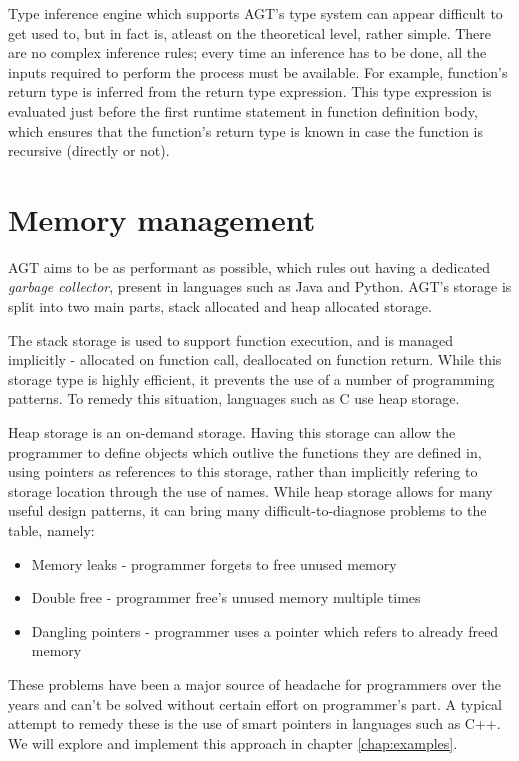 \documentclass[times, utf8, diplomski]{fer}
\theoremstyle{definition}
\begin{document}
Type inference engine which supports AGT's type system can appear difficult to
get used to, but in fact is, atleast on the theoretical level, rather simple.
There are no complex inference rules;
every time an inference has to be done, all the inputs required to perform the process must be available.
For example, function's return type is inferred from the return type expression. 
This type expression is evaluated
just before the first runtime statement in function definition body, which
ensures that the function's return type is known in case the function is
recursive (directly or not).

\section{Memory management}

AGT aims to be as performant as possible, which rules out having a dedicated \textit{garbage collector},
present in languages such as Java and Python. AGT's storage is split into two main parts,
stack allocated and heap allocated storage. 

The stack storage is used to support function
execution, and is managed implicitly - allocated on function call, deallocated on function return.
While this storage type is highly efficient, it prevents the use of a number of programming patterns.
To remedy this situation, languages such as C use heap storage. 

Heap storage is an on-demand storage. Having this storage can allow the programmer to define
objects which outlive the functions they are defined in, using pointers as references to this storage,
rather than implicitly refering to storage location through the use of names.
While heap storage allows for many useful design patterns, it can bring many difficult-to-diagnose
problems to the table, namely:

\begin{itemize}
    \item Memory leaks - programmer forgets to free unused memory
    \item Double free - programmer free's unused memory multiple times
    \item Dangling pointers - programmer uses a pointer which refers to already freed memory
\end{itemize}

These problems have been a major source of headache for programmers over the years and can't be solved
without certain effort on programmer's part. A typical attempt to remedy these is the use of 
smart pointers in languages such as C++. We will explore and implement this approach in 
chapter \ref{chap:examples}.
\end{document}
